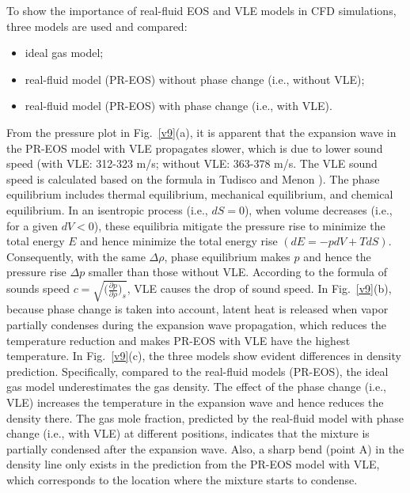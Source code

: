 To show the importance of real-fluid EOS and VLE models in CFD simulations, three models are used and compared:
\begin{itemize}
    \item ideal gas model;
    \item real-fluid model (PR-EOS) without phase change (i.e., without VLE);
    \item real-fluid model (PR-EOS) with phase change (i.e., with VLE).
\end{itemize} %
From the pressure plot in Fig.~\ref{v9}(a), it is apparent that the expansion wave in the PR-EOS model with VLE propagates slower, which is due to lower sound speed (with VLE: 312-323 m/s; without VLE: 363-378 m/s. The VLE sound speed is calculated based on the formula in Tudisco and Menon \cite{tudisco2020analytical}). The phase equilibrium includes thermal equilibrium, mechanical equilibrium, and chemical equilibrium. In an isentropic process (i.e., $dS=0$), when volume decreases (i.e., for a given $dV<0$), these equilibria mitigate the pressure rise to minimize the total energy $E$ and hence minimize the total energy rise $(dE = -pdV + TdS)$. Consequently, with the same $\Delta\rho$, phase equilibrium makes $p$ and hence the pressure rise $\Delta p$ smaller than those without VLE. According to the formula of sounds speed $c=\sqrt{\Big(\frac{\partial p}{\partial \rho}\Big)_s}$, VLE causes the drop of sound speed.
In Fig.~\ref{v9}(b), because phase change is taken into account, latent heat is released when vapor partially condenses during the expansion wave propagation, which reduces the temperature reduction and makes PR-EOS with VLE have the highest temperature. In Fig.~\ref{v9}(c), the three models show evident differences in density prediction. Specifically, compared to the real-fluid models (PR-EOS), the ideal gas model underestimates the gas density. The effect of the phase change (i.e., VLE) increases the temperature in the expansion wave and hence reduces the density there. The gas mole fraction, predicted by the real-fluid model with phase change (i.e., with VLE) at different positions, indicates that the mixture is partially condensed after the expansion wave. Also, a sharp bend (point A) in the density line only exists in the prediction from the PR-EOS model with VLE, which corresponds to the location where the mixture starts to condense.

